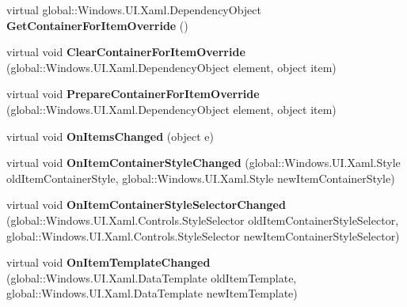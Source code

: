 \begin{DoxyCompactItemize}
virtual global\+::\+Windows.\+U\+I.\+Xaml.\+Dependency\+Object {\bfseries Get\+Container\+For\+Item\+Override} ()
\item 
\mbox{\label{class_windows_1_1_u_i_1_1_xaml_1_1_controls_1_1_items_control_af3c1217d5a48fec76e474ba4bf48a67a}} 
virtual void {\bfseries Clear\+Container\+For\+Item\+Override} (global\+::\+Windows.\+U\+I.\+Xaml.\+Dependency\+Object element, object item)
\item 
\mbox{\label{class_windows_1_1_u_i_1_1_xaml_1_1_controls_1_1_items_control_ab41bdb021d690e9fd35d99c8455e58cf}} 
virtual void {\bfseries Prepare\+Container\+For\+Item\+Override} (global\+::\+Windows.\+U\+I.\+Xaml.\+Dependency\+Object element, object item)
\item 
\mbox{\label{class_windows_1_1_u_i_1_1_xaml_1_1_controls_1_1_items_control_af4965a6cf05198973920cd4d95c82dbc}} 
virtual void {\bfseries On\+Items\+Changed} (object e)
\item 
\mbox{\label{class_windows_1_1_u_i_1_1_xaml_1_1_controls_1_1_items_control_a6621d703e5349274aade1e24d36daf58}} 
virtual void {\bfseries On\+Item\+Container\+Style\+Changed} (global\+::\+Windows.\+U\+I.\+Xaml.\+Style old\+Item\+Container\+Style, global\+::\+Windows.\+U\+I.\+Xaml.\+Style new\+Item\+Container\+Style)
\item 
\mbox{\label{class_windows_1_1_u_i_1_1_xaml_1_1_controls_1_1_items_control_ad8e007d53e0d23a9f7110575da6f5432}} 
virtual void {\bfseries On\+Item\+Container\+Style\+Selector\+Changed} (global\+::\+Windows.\+U\+I.\+Xaml.\+Controls.\+Style\+Selector old\+Item\+Container\+Style\+Selector, global\+::\+Windows.\+U\+I.\+Xaml.\+Controls.\+Style\+Selector new\+Item\+Container\+Style\+Selector)
\item 
\mbox{\label{class_windows_1_1_u_i_1_1_xaml_1_1_controls_1_1_items_control_af029f0f8a1bb58b753a65311caf08358}} 
virtual void {\bfseries On\+Item\+Template\+Changed} (global\+::\+Windows.\+U\+I.\+Xaml.\+Data\+Template old\+Item\+Template, global\+::\+Windows.\+U\+I.\+Xaml.\+Data\+Template new\+Item\+Template)

\end{DoxyCompactItemize}
